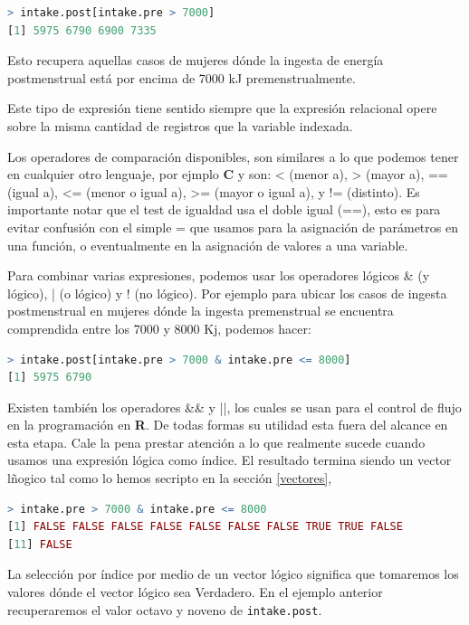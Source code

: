 \begin{lstlisting}[language=R]
> intake.post[intake.pre > 7000]
[1] 5975 6790 6900 7335
\end{lstlisting}

Esto recupera aquellas casos de mujeres dónde la ingesta de energía
postmenstrual está por encima de 7000 kJ premenstrualmente.

Este tipo de expresión tiene sentido siempre que la expresión relacional opere
sobre la misma cantidad de registros que la variable indexada.

Los operadores de comparación disponibles, son similares a lo que podemos tener
en cualquier otro lenguaje, por ejmplo \textbf{C} y son: < (menor a), > (mayor
a), == (igual a), <= (menor o igual a), >= (mayor o igual a), y != (distinto).
Es importante notar que el test de igualdad usa el doble igual (==), esto es
para evitar confusión con el simple = que usamos para la asignación de
parámetros en una función, o eventualmente en la asignación de valores a una
variable.

Para combinar varias expresiones, podemos usar los operadores lógicos \& (y
lógico), | (o lógico) y ! (no lógico). Por ejemplo para ubicar los casos de
ingesta postmenstrual en mujeres dónde la ingesta premenstrual se encuentra
comprendida entre los 7000 y 8000 Kj, podemos hacer:

\begin{lstlisting}[language=R]
> intake.post[intake.pre > 7000 & intake.pre <= 8000]
[1] 5975 6790
\end{lstlisting}

Existen también los operadores \&\& y ||, los cuales se usan para el control de
flujo en la programación en \textbf{R}. De todas formas su utilidad esta fuera
del alcance en esta etapa.  Cale la pena prestar atención a lo que realmente
sucede cuando usamos una expresión lógica como índice. El resultado termina
siendo un vector lñogico tal como lo hemos secripto en la sección
\ref{vectores},

\begin{lstlisting}[language=R]
> intake.pre > 7000 & intake.pre <= 8000
[1] FALSE FALSE FALSE FALSE FALSE FALSE FALSE TRUE TRUE FALSE
[11] FALSE
\end{lstlisting}

La selección por índice por medio de un vector lógico significa que tomaremos
los valores dónde el vector lógico sea Verdadero. En el ejemplo anterior
recuperaremos el valor octavo y noveno de \texttt{intake.post}.

